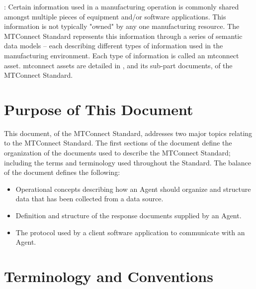 :  Certain information used in a manufacturing operation is commonly shared amongst multiple pieces of equipment and/or software applications.  This information is not typically "owned" by any one manufacturing resource.  The MTConnect Standard represents this information through a series of \glspl{semantic data model} – each describing different types of information used in the manufacturing environment.  Each type of information is called an \gls{mtconnect asset}. \glspl{mtconnect asset} are detailed in , and its sub-\glspl{part document}, of the MTConnect Standard.

\section{Purpose of This Document}

This document,  of the \gls{MTConnect}  Standard, addresses two major topics relating to the MTConnect Standard.  The first sections of the document define the organization of the documents used to describe the MTConnect Standard; including the terms and terminology used throughout the Standard.  The balance of the document defines the following:

\begin{itemize}
\item Operational concepts describing how an \gls{Agent} should organize and structure data that has been collected from a data source.

\item Definition and structure of the \glspl{response document} supplied by an \gls{Agent}.

\item The protocol used by a client software application to communicate with an \gls{Agent}.
\end{itemize}

\section{Terminology and Conventions} \label{sec:Terminology and Conventions} 

\printglossary


\printbibliography[title=MTConnect References,keyword=MTC]


\printbibliography[title=Other References,notkeyword=MTC]

\nolinenumbers
\glsaddallunused
\nolinenumbers

\linenumbers